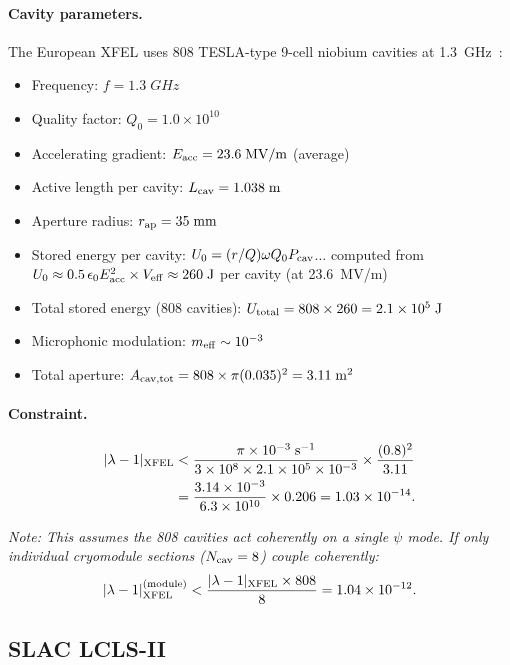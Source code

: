 \documentclass[aps,prd,twocolumn,superscriptaddress,floatfix,nofootinbib]{revtex4-2}
\newcommand{\lam}{\lambda}
\begin{document}
\paragraph{Cavity parameters.}
The European XFEL uses 808 TESLA-type 9-cell niobium cavities
at 1.3~GHz~\cite{Weise2017}:
\begin{itemize}[nosep]
\item Frequency: $f = 1.3\;\si{GHz}$
\item Quality factor: $Q_0 = 1.0\times10^{10}$
\item Accelerating gradient: $E_{\rm acc} = 23.6\;\si{MV/m}$
(average)
\item Active length per cavity: $L_{\rm cav} = 1.038\;\si{m}$
\item Aperture radius: $r_{\rm ap} = 35\;\si{mm}$
\item Stored energy per cavity: $U_0 = (r/Q)\omega Q_0 P_{\rm cav}$...
computed from $U_0 \approx 0.5\,\epsilon_0 E_{\rm acc}^2 \times
V_{\rm eff} \approx 260\;\si{J}$ per cavity (at 23.6~MV/m)
\item Total stored energy (808 cavities): $U_{\rm total}
= 808 \times 260 = 2.1\times10^5\;\si{J}$
\item Microphonic modulation: $m_{\rm eff} \sim 10^{-3}$
\item Total aperture: $A_{\rm cav,tot} = 808 \times \pi(0.035)^2
= 3.11\;\si{m^2}$
\end{itemize}

\paragraph{Constraint.}
\begin{align}
|\lam-1|_{\rm XFEL} &< \frac{\pi \times 10^{-3}\;\si{s^{-1}}}
{3\times10^8 \times 2.1\times10^5 \times 10^{-3}}
\times \frac{(0.8)^2}{3.11} \notag\\
&= \frac{3.14\times10^{-3}}{6.3\times10^{10}}
\times 0.206 = 1.03\times10^{-14}.
\end{align}

\emph{Note: This assumes the 808 cavities act coherently on a single
$\psi$ mode. If only individual cryomodule sections ($N_{\rm cav} = 8$)
couple coherently:}
\begin{equation}
|\lam-1|_{\rm XFEL}^{(\rm module)} < \frac{|\lam-1|_{\rm XFEL}
\times 808}{8} = 1.04\times10^{-12}.
\end{equation}

\subsection{SLAC LCLS-II}\label{sec:lcls}
\end{document}
